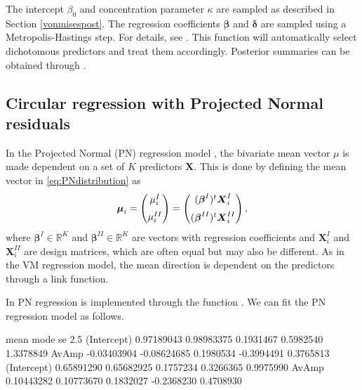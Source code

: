 The intercept \(\beta_0\) and concentration parameter \(\kappa\) are
sampled as described in Section \ref{vonmisespost}. The regression
coefficients \(\boldsymbol{\beta}\) and \(\boldsymbol{\delta}\) are
sampled using a Metropolis-Hastings step. For details, see
\citep{mulder2017bayesian}. This function will automatically select
dichotomous predictors and treat them accordingly. Posterior summaries
can be obtained through .

\hypertarget{circular-regression-with-projected-normal-residuals}{%
\subsection{Circular regression with Projected Normal
residuals}\label{circular-regression-with-projected-normal-residuals}}

\label{projreg}

In the Projected Normal (PN) regression model \citep{nunez2011bayesian},
the bivariate mean vector \(\mu\) is made dependent on a set of \(K\)
predictors \(\boldsymbol{X}\). This is done by defining the mean vector
in \eqref{eq:PNdistribution} as \begin{equation}
\boldsymbol{\mu}_{i} = \begin{pmatrix}
  \mu_{i}^{I}  \vspace{0.2cm}  \\
\mu_{i}^{II}
 \end{pmatrix}=\begin{pmatrix}
  (\boldsymbol{\beta}^{I})^{t}\boldsymbol{X}_{i}^{I}  \vspace{0.2cm}  \\
  (\boldsymbol{\beta}^{II})^{t}\boldsymbol{X}_{i}^{II} 
 \end{pmatrix},
\end{equation} where \(\boldsymbol{\beta}^{I} \in \mathbb{R}^K\) and
\(\boldsymbol{\beta}^{II} \in \mathbb{R}^K\) are vectors with regression
coefficients and \(\boldsymbol{X}_{i}^{I}\) and
\(\boldsymbol{X}_{i}^{II}\) are design matrices, which are often equal
but may also be different. As in the VM regression model, the mean
direction is dependent on the predictors through a link function.

In  PN regression is implemented through the function
. We can fit the PN regression model as follows.

\begin{CodeChunk}


\begin{CodeOutput}
                   mean        mode        se       2.5%
(Intercept)  0.97189043  0.98983375 0.1931467  0.5982540 1.3378849
AvAmp       -0.03403904 -0.08624685 0.1980534 -0.3994491 0.3765813
(Intercept)  0.65891290  0.65682925 0.1757234  0.3266365 0.9975990
AvAmp        0.10443282  0.10773670 0.1832027 -0.2368230 0.4708930
\end{CodeOutput}
\end{CodeChunk}

